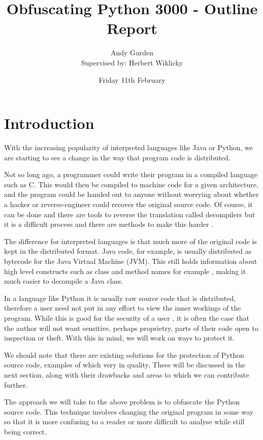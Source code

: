 \documentclass{report}
\title{Obfuscating Python 3000 - Outline Report}
\author{Andy Gurden\\Supervised by: Herbert Wiklicky}
\date{Friday 11th February}
\begin{document}
\maketitle

\section{Introduction}

With the increasing popularity of interpreted languages like Java or Python, we are starting
to see a change in the way that program code is distributed.

Not so long ago, a programmer could write their program in a compiled language such as C. This would then be compiled
to machine code for a given architecture, and the program could be handed out to anyone without
worrying about whether a hacker or reverse-engineer could recover the original source code.
Of course, it can be done and there are tools to reverse the translation called decompilers\cite{cdecomp} but it
is a difficult process and there are methods to make this harder \cite{disres}.

The difference for interpreted languages is that much more of the original code is kept in the
distributed format. Java code, for example, is usually distributed as bytecode for the Java Virtual
Machine (JVM). This still holds information about high level constructs such as class and method names for example \cite{classinfo},
making it much easier to decompile a Java class.

In a language like Python it is usually raw source code that is distributed, therefore a
user need not put in any effort to view the inner workings of the program. While this is good
for the security of a user \cite{noobf}, it is often the case that the author will not want sensitive,
perhaps proprietry, parts of their code open to inspection or theft. With this in mind, we will work on ways to protect it.

We should note that there are existing solutions for the protection of Python source code, examples of which very in quality.
These will be discussed in the next section, along with their drawbacks and areas to which we can contribute further.

The approach we will take to the above problem is to obfuscate the Python source code. This technique involves changing the
original program in some way so that it is more confusing to a reader or more difficult to analyse while still being correct.
\end{document}
